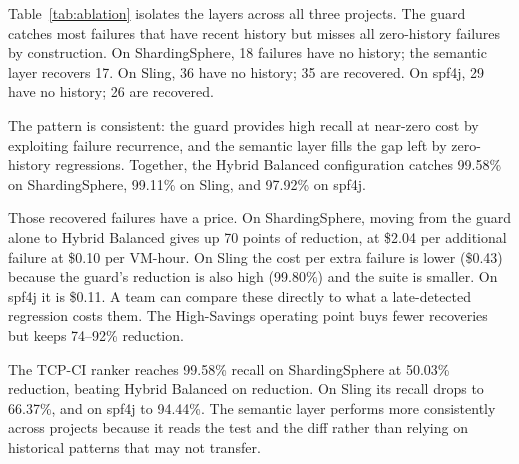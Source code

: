

Table~\ref{tab:ablation} isolates the layers across all three projects. The guard catches most failures that have recent history but misses all zero-history failures by construction. On ShardingSphere, 18 failures have no history; the semantic layer recovers 17. On Sling, 36 have no history; 35 are recovered. On spf4j, 29 have no history; 26 are recovered.

The pattern is consistent: the guard provides high recall at near-zero cost by exploiting failure recurrence, and the semantic layer fills the gap left by zero-history regressions. Together, the Hybrid Balanced configuration catches 99.58\% on ShardingSphere, 99.11\% on Sling, and 97.92\% on spf4j.

Those recovered failures have a price. On ShardingSphere, moving from the guard alone to Hybrid Balanced gives up 70 points of reduction, at \$2.04 per additional failure at \$0.10 per VM-hour. On Sling the cost per extra failure is lower (\$0.43) because the guard's reduction is also high (99.80\%) and the suite is smaller. On spf4j it is \$0.11. A team can compare these directly to what a late-detected regression costs them. The High-Savings operating point buys fewer recoveries but keeps 74--92\% reduction.

The TCP-CI ranker reaches 99.58\% recall on ShardingSphere at 50.03\% reduction, beating Hybrid Balanced on reduction. On Sling its recall drops to 66.37\%, and on spf4j to 94.44\%. The semantic layer performs more consistently across projects because it reads the test and the diff rather than relying on historical patterns that may not transfer.
